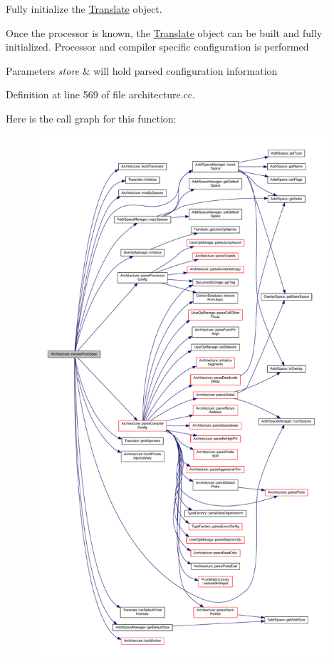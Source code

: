Fully initialize the \mbox{\hyperlink{class_translate}{Translate}} object. 

Once the processor is known, the \mbox{\hyperlink{class_translate}{Translate}} object can be built and fully initialized. Processor and compiler specific configuration is performed 
\begin{DoxyParams}{Parameters}
{\em store} & will hold parsed configuration information \\
\hline
\end{DoxyParams}


Definition at line 569 of file architecture.\+cc.

Here is the call graph for this function\+:
\nopagebreak
\begin{figure}[H]
\begin{center}
\leavevmode
\includegraphics[height=550pt]{class_architecture_aed18df408eb73d0735966c68b44e413b_cgraph}
\end{center}
\end{figure}
